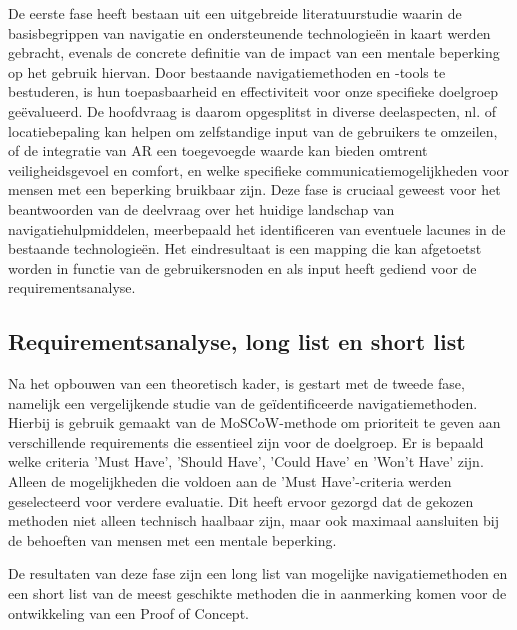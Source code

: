 De eerste fase heeft bestaan uit een uitgebreide literatuurstudie waarin de basisbegrippen van navigatie en ondersteunende technologieën in kaart werden gebracht, evenals de concrete definitie van de impact van een mentale beperking op het gebruik hiervan. Door bestaande navigatiemethoden en -tools te bestuderen, is hun toepasbaarheid en effectiviteit voor onze specifieke doelgroep geëvalueerd. De hoofdvraag is daarom opgesplitst in diverse deelaspecten, nl. of locatiebepaling kan helpen om zelfstandige input van de gebruikers te omzeilen, of de integratie van AR een toegevoegde waarde kan bieden omtrent veiligheidsgevoel en comfort, en welke specifieke communicatiemogelijkheden voor mensen met een beperking bruikbaar zijn. Deze fase is cruciaal geweest voor het beantwoorden van de deelvraag over het huidige landschap van navigatiehulpmiddelen, meerbepaald het identificeren van eventuele lacunes in de bestaande technologieën. Het eindresultaat is een mapping die kan afgetoetst worden in functie van de gebruikersnoden en als input heeft gediend voor de requirementsanalyse.

\subsection*{Requirementsanalyse, long list en short list}

Na het opbouwen van een theoretisch kader, is gestart met de tweede fase, namelijk een vergelijkende studie van de geïdentificeerde navigatiemethoden. Hierbij is gebruik gemaakt van de MoSCoW-methode om prioriteit te geven aan verschillende requirements die essentieel zijn voor de doelgroep. Er is bepaald welke criteria 'Must Have', 'Should Have', 'Could Have' en 'Won't Have' zijn. Alleen de mogelijkheden die voldoen aan de 'Must Have'-criteria werden geselecteerd voor verdere evaluatie. Dit heeft ervoor gezorgd dat de gekozen methoden niet alleen technisch haalbaar zijn, maar ook maximaal aansluiten bij de behoeften van mensen met een mentale beperking.

De resultaten van deze fase zijn een long list van mogelijke navigatiemethoden en een short list van de meest geschikte methoden die in aanmerking komen voor de ontwikkeling van een Proof of Concept.

